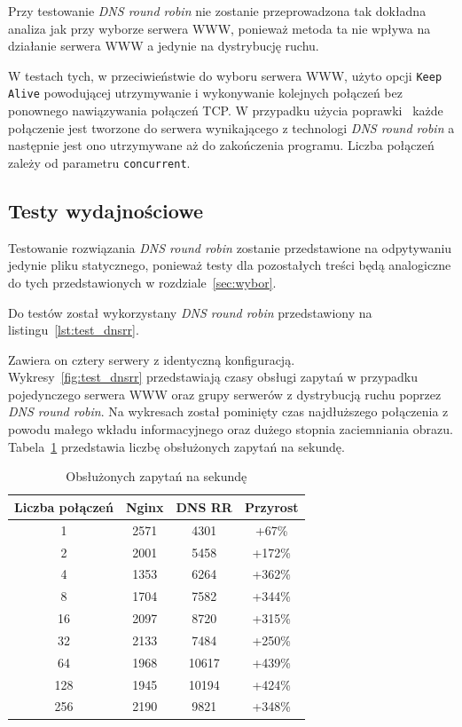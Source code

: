 Przy testowanie \textit{DNS round robin} nie zostanie przeprowadzona tak dokładna analiza jak przy wyborze serwera WWW, ponieważ metoda ta nie wpływa na działanie serwera WWW a jedynie na dystrybucję ruchu.

W testach tych, w przeciwieństwie do wyboru serwera WWW, użyto opcji \texttt{Keep Alive} powodującej utrzymywanie i wykonywanie kolejnych połączeń bez ponownego nawiązywania połączeń TCP\@.
W przypadku użycia poprawki~\cite{ab_dnsrr} każde połączenie jest tworzone do serwera wynikającego z technologi \textit{DNS round robin} a następnie jest ono utrzymywane aż do zakończenia programu. Liczba połączeń zależy od parametru \texttt{concurrent}.
\subsection{Testy wydajnościowe}
Testowanie rozwiązania \textit{DNS round robin} zostanie przedstawione na odpytywaniu jedynie pliku statycznego, ponieważ testy dla pozostałych treści będą analogiczne do tych przedstawionych w rozdziale~\ref{sec:wybor}.

Do testów został wykorzystany \textit{DNS round robin} przedstawiony na listingu~\ref{lst:test_dnsrr}.

Zawiera on cztery serwery z identyczną konfiguracją.\\
Wykresy~\ref{fig:test_dnsrr} przedstawiają czasy obsługi zapytań w przypadku pojedynczego serwera WWW oraz grupy serwerów z dystrybucją ruchu poprzez \textit{DNS round robin}.
Na wykresach został pominięty czas najdłuższego połączenia z powodu małego wkładu informacyjnego oraz dużego stopnia zaciemniania obrazu.
Tabela~\ref{tab:test_dnsrr} przedstawia liczbę obsłużonych zapytań na sekundę.
\begin{table}[h]
\centering
\begin{tabular}{cccc}
	\toprule
	Liczba połączeń & Nginx & DNS RR & Przyrost\\
	\midrule
	\midrule
	1&2571&4301& +67\%\\
	\midrule
	2&2001&5458& +172\%\\
	\midrule
	4&1353&6264& +362\%\\
	\midrule
	8&1704&7582& +344\%\\
	\midrule
	16&2097&8720& +315\%\\
	\midrule
	32&2133&7484& +250\%\\
	\midrule
	64&1968&10617& +439\%\\
	\midrule
	128&1945&10194& +424\%\\
	\midrule
	256&2190&9821& +348\%\\
	\bottomrule
\end{tabular}
\caption{Obsłużonych zapytań na sekundę}
\label{tab:test_dnsrr}
\end{table}

